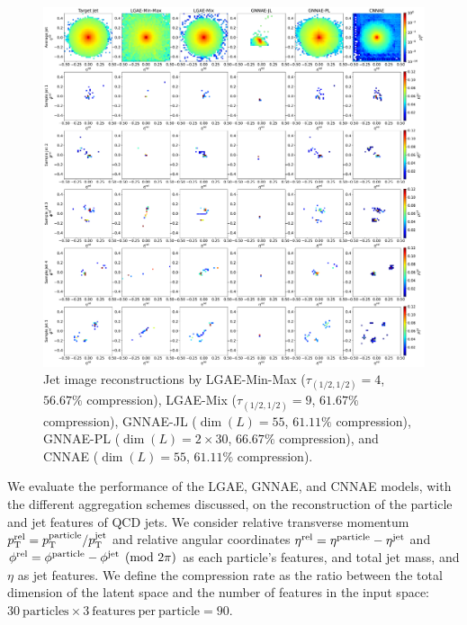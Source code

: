 \begin{figure}[ht!]
    \centering
    \includegraphics[width=\linewidth]{figures/06-ML4Jets/lgae/reconstructions/jet_images-cnnae.pdf}
    \caption[Jet image reconstructions.]{Jet image reconstructions by
        LGAE-Min-Max ($\tau_{(1/2, 1/2)}=4$, $56.67\%$ compression),
        LGAE-Mix ($\tau_{(1/2, 1/2)}=9$, $61.67\%$ compression),
        GNNAE-JL ($\dim(L) = 55$, $61.11\%$ compression),
        GNNAE-PL ($\dim(L) = 2\times 30$, $66.67\%$ compression), and CNNAE ($\dim(L) = 55$, $61.11\%$ compression).
    }
    \label{fig:06_lgae_recons-jet-imgs}
\end{figure}


We evaluate the performance of the LGAE, GNNAE, and CNNAE models, with the different aggregation schemes discussed, on the reconstruction of the particle and jet features of QCD jets.
We consider relative transverse momentum
$p_{\mathrm{T}}^{\mathrm{rel}} = p_{\mathrm{T}}^{\mathrm{particle}}/p_{\mathrm{T}}^{\mathrm{jet}}$ and relative angular coordinates
$\eta^{\mathrm{rel}} =\eta^{\mathrm{particle}} - \eta^{\mathrm{jet}}$ and
$\phi^{\mathrm{rel}} =\phi^{\mathrm{particle}} - \phi^{\mathrm{jet}} \pmod{2\pi}$
as each particle's features, and total jet mass, \pt and $\eta$ as jet features.
We define the compression rate as the ratio between the total dimension of the latent space and the number of features in the input space: $30\ \mathrm{particles} \times 3\ \mathrm{features\ per\ particle} = 90$.

